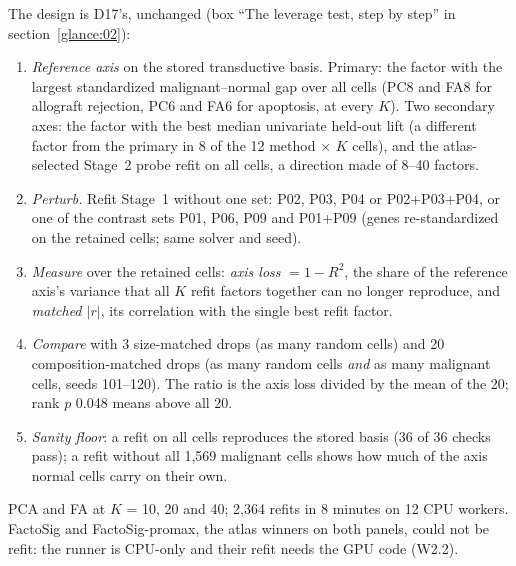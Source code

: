 The design is D17's, unchanged (box ``The leverage test, step by step'' in section~\ref{glance:02}):
\begin{enumerate}[label=\arabic*.,leftmargin=1.4em]
\item \emph{Reference axis} on the stored transductive basis. Primary: the factor with the largest standardized malignant--normal gap over all cells (PC8 and FA8 for allograft rejection, PC6 and FA6 for apoptosis, at every $K$). Two secondary axes: the factor with the best median univariate held-out lift (a different factor from the primary in 8 of the 12 method $\times$ $K$ cells), and the atlas-selected Stage~2 probe refit on all cells, a direction made of 8--40 factors.
\item \emph{Perturb.} Refit Stage~1 without one set: P02, P03, P04 or P02+P03+P04, or one of the contrast sets P01, P06, P09 and P01+P09 (genes re-standardized on the retained cells; same solver and seed).
\item \emph{Measure} over the retained cells: \emph{axis loss} $= 1 - R^2$, the share of the reference axis's variance that all $K$ refit factors together can no longer reproduce, and \emph{matched $|r|$}, its correlation with the single best refit factor.
\item \emph{Compare} with 3 size-matched drops (as many random cells) and 20 composition-matched drops (as many random cells \emph{and} as many malignant cells, seeds 101--120). The ratio is the axis loss divided by the mean of the 20; rank $p$ 0.048 means above all 20.
\item \emph{Sanity floor}: a refit on all cells reproduces the stored basis (36 of 36 checks pass); a refit without all 1,569 malignant cells shows how much of the axis normal cells carry on their own.
\end{enumerate}
PCA and FA at $K$ = 10, 20 and 40; 2,364 refits in 8 minutes on 12 CPU workers. FactoSig and FactoSig-promax, the atlas winners on both panels, could not be refit: the runner is CPU-only and their refit needs the GPU code (W2.2). 

